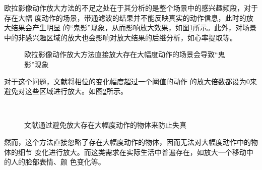 欧拉影像动作放大方法的不足之处在于其分析的是整个场景中的感兴趣频段，对于存在大幅
度动作的场景，带通滤波的结果并不能反映真实的动作信息，此时的放大结果会产生明显
的“鬼影”现象，从而影响放大效果，如图\ref{fig:large-motion}所示。此外，对场景
中的非感兴趣区域的放大也会影响对放大结果的后继分析，如心率提取等。

\begin{figure}[htbp]
  \centering
  \qquad
  \caption{欧拉影像动作放大方法直接放大存在大幅度动作的场景会导致“鬼影”现象}
  \label{fig:large-motion}
\end{figure}

对于这个问题，文献\cite{Wadhwa2013PhaseBased}将相位的变化幅度超过一个阈值的动作
的放大倍数都设为0来避免对这些区域进行放大。如图\ref{fig:ignore}所示。

\begin{figure}[htbp]
  \centering
  ~
  \caption{文献\cite{Wadhwa2013PhaseBased}通过避免放大存在大幅度动作的物体来防止失真}
  \label{fig:ignore}
\end{figure}

然而，这个方法直接忽略了存在大幅度动作的物体，因而无法对大幅度动作中的物体的细节
变化进行放大。而这类需求在实际生活中普遍存在，如放大一个移动中的人的脸部表情、颜
色变化等。

